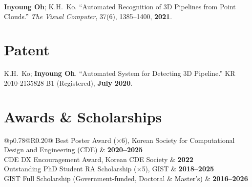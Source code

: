 \documentclass[10pt,a4paper]{article}
\begin{document}
	\noindent
	\textbf{Inyoung Oh}; K.H.\ Ko.
	``Automated Recognition of 3D Pipelines from Point Clouds.''
	\textit{The Visual Computer}, 37(6), 1385--1400, \textbf{2021}.\\
	
	
	
	
	
	
	\section*{Patent}
	\noindent
	K.H.\ Ko; \textbf{Inyoung Oh}.
	``Automated System for Detecting 3D Pipeline.''
	KR 2010-2135828 B1 (Registered), \textbf{July 2020}.
	
	\section*{Awards \& Scholarships}
	\noindent
	\begin{tabular*}{\textwidth}{@{}p{}@{\extracolsep{\fill}}R{0.20\textwidth}@{}}
		Best Poster Award ($\times$6), Korean Society for Computational Design and Engineering (CDE) & \textbf{2020--2025} \\
		CDE DX Encouragement Award, Korean CDE Society & \textbf{2022} \\
		Outstanding PhD Student RA Scholarship ($\times$5), GIST & \textbf{2018--2025} \\
		GIST Full Scholarship (Government-funded, Doctoral \& Master's) & \textbf{2016--2026} \\
	\end{tabular*}
	
\end{document}
